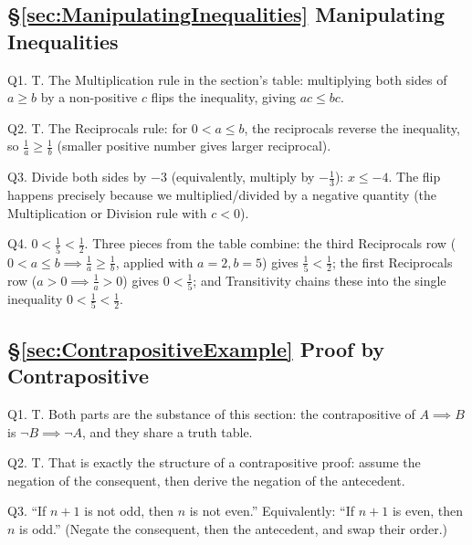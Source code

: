 \subsection*{\S\ref{sec:ManipulatingInequalities} Manipulating Inequalities}
\hypertarget{a:ch0:ineq}{}
\noindent Q1. T. The Multiplication rule in the section's table: multiplying both sides of $a \geq b$ by a non-positive $c$ flips the inequality, giving $ac \leq bc$.\par\smallskip
\noindent Q2. T. The Reciprocals rule: for $0 < a \leq b$, the reciprocals reverse the inequality, so $\tfrac{1}{a} \geq \tfrac{1}{b}$ (smaller positive number gives larger reciprocal).\par\smallskip
\noindent Q3. Divide both sides by $-3$ (equivalently, multiply by $-\tfrac{1}{3}$): $x \leq -4$. The flip happens precisely because we multiplied/divided by a negative quantity (the Multiplication or Division rule with $c < 0$).\par\smallskip
\noindent Q4. $0 < \tfrac{1}{5} < \tfrac{1}{2}$. Three pieces from the table combine: the third Reciprocals row ($0 < a \leq b \implies \tfrac{1}{a} \geq \tfrac{1}{b}$, applied with $a=2, b=5$) gives $\tfrac{1}{5} < \tfrac{1}{2}$; the first Reciprocals row ($a > 0 \implies \tfrac{1}{a} > 0$) gives $0 < \tfrac{1}{5}$; and Transitivity chains these into the single inequality $0 < \tfrac{1}{5} < \tfrac{1}{2}$.\par\smallskip
\hfill{}\par\medskip

\subsection*{\S\ref{sec:ContrapositiveExample} Proof by Contrapositive}
\hypertarget{a:ch0:contrapos}{}
\noindent Q1. T. Both parts are the substance of this section: the contrapositive of $A \implies B$ is $\lnot B \implies \lnot A$, and they share a truth table.\par\smallskip
\noindent Q2. T. That is exactly the structure of a contrapositive proof: assume the negation of the consequent, then derive the negation of the antecedent.\par\smallskip
\noindent Q3. ``If $n+1$ is not odd, then $n$ is not even.'' Equivalently: ``If $n+1$ is even, then $n$ is odd.'' (Negate the consequent, then the antecedent, and swap their order.)\par\smallskip
\hfill{}\par\medskip

